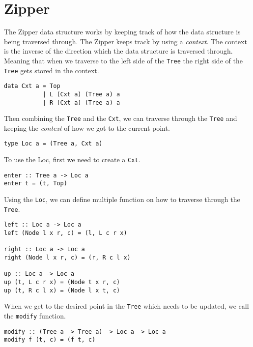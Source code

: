 \section{Zipper}


The Zipper data structure works by keeping track of how the data structure is being traversed through. The Zipper keeps track by using a \textit{context}. The context is the inverse of the direction which the data structure is traversed through. Meaning that when we traverse to the left side of the \texttt{Tree} the right side of the \texttt{Tree} gets stored in the context. 

\begin{verbatim}
data Cxt a = Top
           | L (Cxt a) (Tree a) a
           | R (Cxt a) (Tree a) a
\end{verbatim}

Then combining the \texttt{Tree} and the \texttt{Cxt}, we can traverse through the \texttt{Tree} and keeping the \textit{context} of how we got to the current point.

\begin{verbatim}
type Loc a = (Tree a, Cxt a)
\end{verbatim}

To use the Loc, first we need to create a \texttt{Cxt}.

\begin{verbatim}
enter :: Tree a -> Loc a
enter t = (t, Top)
\end{verbatim}

Using the \texttt{Loc}, we can define multiple function on how to traverse through the \texttt{Tree}.

\begin{verbatim}
left :: Loc a -> Loc a
left (Node l x r, c) = (l, L c r x)

right :: Loc a -> Loc a
right (Node l x r, c) = (r, R c l x)

up :: Loc a -> Loc a
up (t, L c r x) = (Node t x r, c)
up (t, R c l x) = (Node l x t, c)
\end{verbatim}

When we get to the desired point in the \texttt{Tree} which needs to be updated, we call the \texttt{modify} function.

\begin{verbatim}
modify :: (Tree a -> Tree a) -> Loc a -> Loc a
modify f (t, c) = (f t, c)
\end{verbatim}

